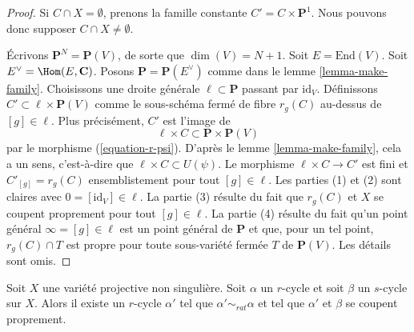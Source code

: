 \begin{proof}
Si $C \cap X = \emptyset$, prenons la famille constante
$C' = C \times \mathbf{P}^1$. Nous pouvons donc supposer
$C \cap X \not = \emptyset$.

\medskip\noindent
Écrivons $\mathbf{P}^N = \mathbf{P}(V)$, de sorte que $\dim(V) = N + 1$. Soit
$E = \text{End}(V)$. Soit $E^\vee = \Hom(E, \mathbf{C})$. Posons
$\mathbf{P} = \mathbf{P}(E^\vee)$ comme dans le lemme \ref{lemma-make-family}.
Choisissons une droite générale $\ell \subset \mathbf{P}$ passant par $\text{id}_V$.
Définissons $C' \subset \ell \times \mathbf{P}(V)$ comme le
sous-schéma fermé de fibre $r_g(C)$ au-dessus de $[g] \in \ell$.
Plus précisément, $C'$ est l'image de
$$
\ell \times C \subset \mathbf{P} \times \mathbf{P}(V)
$$
par le morphisme (\ref{equation-r-psi}). D'après le lemme \ref{lemma-make-family},
cela a un sens, c'est-à-dire que $\ell \times C \subset U(\psi)$. Le morphisme
$\ell \times C \to C'$ est fini et $C'_{[g]} = r_g(C)$ ensemblistement
pour tout $[g] \in \ell$. Les parties (1) et (2) sont claires avec
$0 = [\text{id}_V] \in \ell$. La partie (3) résulte du fait
que $r_g(C)$ et $X$ se coupent proprement pour tout $[g] \in \ell$.
La partie (4) résulte du fait qu'un point général $\infty = [g] \in \ell$
est un point général de $\mathbf{P}$ et que, pour un tel point,
$r_g(C) \cap T$ est propre pour toute sous-variété fermée $T$ de $\mathbf{P}(V)$.
Les détails sont omis.
\end{proof}

\begin{lemma}
\label{lemma-moving-move}
Soit $X$ une variété projective non singulière. Soit $\alpha$ un
$r$-cycle et soit $\beta$ un $s$-cycle sur $X$. Alors il existe
un $r$-cycle $\alpha'$ tel que $\alpha' \sim_{rat} \alpha$ et
tel que $\alpha'$ et $\beta$ se coupent proprement.
\end{lemma}

